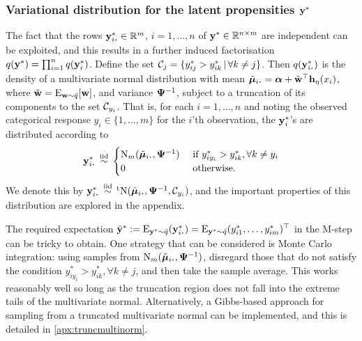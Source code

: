 \subsubsection{Variational distribution for the latent propensities \texorpdfstring{${\mathbf y}^*$}{$y^*$}}

The fact that the rows $\by_{i \bigcdot}^* \in \bbR^m$, $i=1,\dots,n$ of ${\mathbf y}^* \in \mathbb{R}^{n \times m}$ are independent can be exploited, and this results in a further induced factorisation $q({\mathbf y}^*) = \prod_{i=1}^n q({\mathbf y}_i^*)$.
Define the set ${\mathcal C}_j = \{y_{ij}^* > y_{ik}^* \,|\, \forall k\neq j \}$.
Then $q(\by_{i \bigcdot}^*)$ is the density of a multivariate normal distribution with mean $\tilde \bmu_{i \bigcdot} = \balpha + \tilde\bw^\top  \bh_\eta(x_i)$, where $\tilde {{\mathbf w}} = \operatorname{E}_{{\mathbf w}\sim\tilde q}[{\mathbf w}]$, and variance ${\bm\Psi}^{-1}$, subject to a truncation of its components to the set ${\mathcal C}_{y_i}$.
That is, for each $i=1,\dots,n$ and noting the observed categorical response $y_i \in \{1,\dots,m\}$ for the $i$'th observation, the ${\mathbf y}_i^*$'s are distributed according to
\begin{align}\label{eq:ystardist}
  \by_{i \bigcdot}^* \iid
  \begin{cases}
    \N_m(\tilde\bmu_{i \bigcdot},  \bPsi^{-1}) & \text{ if } y_{iy_i}^* > y_{ik}^*, \forall k \neq y_i \\
    0 & \text{ otherwise}. \\
  \end{cases}
\end{align}
We denote this by $\by_{i \bigcdot}^* \iid \tN(\tilde\bmu_{i \bigcdot}, \bPsi^{-1},\cC_{y_i})$, and the important properties of this distribution are explored in the appendix.

The required expectation $\tilde\by^* := \E_{\by^*\sim\tilde q} (\by^*_{i\bigcdot}) = \E_{\by^*\sim\tilde q} (y_{i1}^*,\dots, y_{im}^*)^\top$ in the M-step can be tricky to obtain.
One strategy that can be considered is Monte Carlo integration: using samples from $\N_m(\tilde\bmu_{i \bigcdot},  \bPsi^{-1})$, disregard those that do not satisfy the condition $y_{iy_i}^* > y_{ik}^*, \forall k \neq j$, and then take the sample average.
This works reasonably well so long as the truncation region does not fall into the extreme tails of the multivariate normal.
Alternatively, a Gibbs-based approach \citep{robert1995simulation} for sampling from a truncated multivariate normal can be implemented, and this is detailed in \cref{apx:truncmultinorm}.

